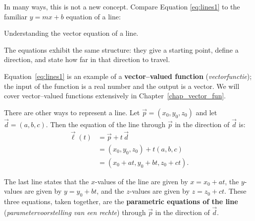 In many ways, this is not a new concept. Compare Equation \eqref{eq:lines1} to the familiar $y=mx+b$ equation of a line:
\usetikzlibrary{calc}
\begin{center}
\captionsetup{type=figure}%
\caption{Understanding the vector equation of a line.}
\label{fig:lines_eq}
\end{center}

The equations exhibit the same structure: they give a starting point, define a direction, and state how far in that direction to travel.

Equation~\eqref{eq:lines1} is an example of a \textbf{vector--valued function} (\textit{vectorfunctie}); the input of the function is a real number and the output is a vector. We will cover vector--valued functions extensively in Chapter~\ref{chap_vector_fun}.
 

There are other ways to represent a line. Let $\vec p = ( x_0,y_0,z_0)$ and let $\vec d = ( a,b,c)$. Then the equation of the line through $\vec p$ in the direction of $\vec d$ is:
\begin{align*}
\vec\ell(t) &= \vec p + t\,\vec d \\
						&= ( x_0,y_0,z_0) + t( a,b,c) \\
						&= ( x_0 + at, y_0+bt, z_0+ct).
\end{align*}

The last line states that the $x$-values of the line are given by $x=x_0+at$, the $y$-values are given by $y = y_0+bt$, and the $z$-values are given by $z = z_0 + ct$. These three equations, taken together, are the \textbf{parametric equations of the line} (\textit{parametervoorstelling van een rechte}) through $\vec p$ in the direction of $\vec d$.
 

